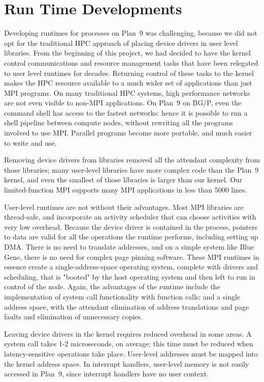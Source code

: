 \chapter{Run Time Developments}
Developing runtimes for processes on Plan~9 was challenging, because we did not opt for the 
traditional HPC approach of placing device drivers in user level libraries. From the beginning of this 
project, we had decided to have the kernel control communications and  
resource management tasks that have 
been relegated to user level runtimes for decades. Returning control of these tasks to  the kernel
makes the HPC resource available to a much wider set of applications than just MPI programs. On 
many traditional HPC systems, high performance networks are not even visible to non-MPI 
applications. On Plan~9 on BG/P, even the command shell has access to the fastest networks: hence
it is 
possible to run a shell pipeline between compute nodes, without rewriting all the 
programs involved to use MPI. Parallel programs become more portable, and much easier to 
write and use. 

Removing device drivers from libraries removed all the attendant complexity from those libraries; 
many user-level libraries have more complex code than the Plan~9 kernel, and even the smallest 
of those libraries is larger than our kernel. Our limited-function MPI supports many MPI applications 
in less than 5000 lines.

User-level runtimes are not without their advantages. Most MPI libraries are thread-safe, and 
incorporate an activity scheduler that can choose activities with very low overhead. Because the 
device driver is contained in the process, pointers to data are valid for all the operations the runtime 
performs, including setting up DMA. There is no need to translate addresses, and 
on a simple system like Blue Gene, there is no need for complex page pinning software. 
These MPI runtimes in essence create a single-address-space operating system, complete with drivers 
and scheduling, that is "booted" by the host operating system and then left to run in control of the
node. Again, the advantages of the runtime include the implementation  of system call functionality 
with function calls; and a single
address space, with the attendant elimination of address translations and page faults and 
elimination of unnecessary copies. 

Leaving device drivers in the kernel requires reduced overhead in some areas. 
A system call takes 1-2 microseconds, on average; this time must be 
reduced when latency-sensitive operations take place. User-level 
addresses must be mapped into the kernel address space. In interrupt handlers, user-level 
memory is not easily accessed in Plan~9, since interrupt handlers have no user context. 

